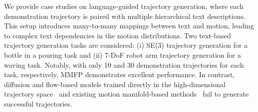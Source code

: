 We provide case studies on language-guided trajectory generation, where each demonstration trajectory is paired with multiple hierarchical text descriptions.  
This setup introduces many-to-many mappings between text and motion, leading to complex text dependencies in the motion distributions.  
Two text-based trajectory generation tasks are considered: (i) SE(3) trajectory generation for a bottle in a pouring task and (ii) 7-DoF robot arm trajectory generation for a waving task. Notably, with only 10 and 30 demonstration trajectories for each task, respectively, MMFP demonstrates excellent performance.  
In contrast, diffusion and flow-based models trained directly in the high-dimensional trajectory space~\cite{ho2020denoising, lipman2022flow, chen2023riemannian} and existing motion manifold-based methods~\cite{noseworthy2020task, lee2023equivariant} fail to generate successful trajectories.